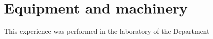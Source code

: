 \chapter{Equipment and machinery}\label{cap:equipment}

This experience was performed in the laboratory of the Department
